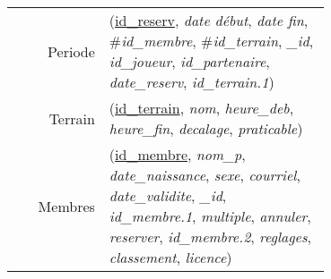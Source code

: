 \documentclass[twocolumn,french]{article}
\newenvironment{mld}
  {\par\begin{minipage}{\linewidth}\begin{tabular}{rp{0.7\linewidth}}}
  {\end{tabular}\end{minipage}\par}
\newcommand{\attr}[1]{\emph{#1}}
\newcommand{\prim}[1]{\uline{#1}}
\newcommand{\foreign}[1]{\#\textsl{#1}}
\begin{document}
\begin{mld}
  Periode & (\prim{id\_reserv}, \attr{date début}, \attr{date fin}, \foreign{id\_membre}, \foreign{id\_terrain}, \attr{\_id}, \attr{id\_joueur}, \attr{id\_partenaire}, \attr{date\_reserv}, \attr{id\_terrain.1})\\
  Terrain & (\prim{id\_terrain}, \attr{nom}, \attr{heure\_deb}, \attr{heure\_fin}, \attr{decalage}, \attr{praticable})\\
  Membres & (\prim{id\_membre}, \attr{nom\_p}, \attr{date\_naissance}, \attr{sexe}, \attr{courriel}, \attr{date\_validite}, \attr{\_id}, \attr{id\_membre.1}, \attr{multiple}, \attr{annuler}, \attr{reserver}, \attr{id\_membre.2}, \attr{reglages}, \attr{classement}, \attr{licence})\\
\end{mld}
\end{document}
